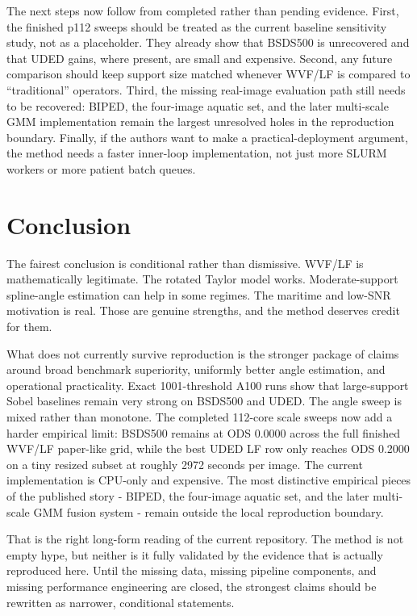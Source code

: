 \documentclass[conference]{IEEEtran}
\begin{document}
The next steps now follow from completed rather than pending evidence. First, the finished p112 sweeps should be treated as the current baseline sensitivity study, not as a placeholder. They already show that BSDS500 is unrecovered and that UDED gains, where present, are small and expensive. Second, any future comparison should keep support size matched whenever WVF/LF is compared to ``traditional'' operators. Third, the missing real-image evaluation path still needs to be recovered: BIPED, the four-image aquatic set, and the later multi-scale GMM implementation remain the largest unresolved holes in the reproduction boundary. Finally, if the authors want to make a practical-deployment argument, the method needs a faster inner-loop implementation, not just more SLURM workers or more patient batch queues.

\section{Conclusion}
The fairest conclusion is conditional rather than dismissive. WVF/LF is mathematically legitimate. The rotated Taylor model works. Moderate-support spline-angle estimation can help in some regimes. The maritime and low-SNR motivation is real. Those are genuine strengths, and the method deserves credit for them.

What does not currently survive reproduction is the stronger package of claims around broad benchmark superiority, uniformly better angle estimation, and operational practicality. Exact 1001-threshold A100 runs show that large-support Sobel baselines remain very strong on BSDS500 and UDED. The angle sweep is mixed rather than monotone. The completed 112-core scale sweeps now add a harder empirical limit: BSDS500 remains at ODS 0.0000 across the full finished WVF/LF paper-like grid, while the best UDED LF row only reaches ODS 0.2000 on a tiny resized subset at roughly 2972 seconds per image. The current implementation is CPU-only and expensive. The most distinctive empirical pieces of the published story - BIPED, the four-image aquatic set, and the later multi-scale GMM fusion system - remain outside the local reproduction boundary.

That is the right long-form reading of the current repository. The method is not empty hype, but neither is it fully validated by the evidence that is actually reproduced here. Until the missing data, missing pipeline components, and missing performance engineering are closed, the strongest claims should be rewritten as narrower, conditional statements.
\end{document}
